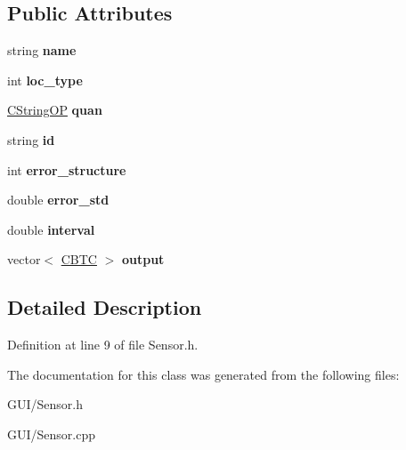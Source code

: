 \subsection*{Public Attributes}
\begin{DoxyCompactItemize}
\item 
\mbox{\label{class_c_sensor_a4289acc92d37101afce47f6d4ead633a}} 
string {\bfseries name}
\item 
\mbox{\label{class_c_sensor_a2e0987a715553b1f45edfa63136a8d91}} 
int {\bfseries loc\+\_\+type}
\item 
\mbox{\label{class_c_sensor_a99c0abe2fd04ec5f48a1b3d432304a10}} 
\hyperlink{class_c_string_o_p}{C\+String\+OP} {\bfseries quan}
\item 
\mbox{\label{class_c_sensor_a125b38fc4560432065fbcc4e34a84eea}} 
string {\bfseries id}
\item 
\mbox{\label{class_c_sensor_a38a11d3bafbfefa72396246f9bac062a}} 
int {\bfseries error\+\_\+structure}
\item 
\mbox{\label{class_c_sensor_af9ac939054634c07660f8a9cbc1cd23a}} 
double {\bfseries error\+\_\+std}
\item 
\mbox{\label{class_c_sensor_a87efad7346099a39d7f6f2f4f224a3a7}} 
double {\bfseries interval}
\item 
\mbox{\label{class_c_sensor_a99ae92275ac6ca39ae238ddfd3090a1f}} 
vector$<$ \hyperlink{class_c_b_t_c}{C\+B\+TC} $>$ {\bfseries output}
\end{DoxyCompactItemize}


\subsection{Detailed Description}


Definition at line 9 of file Sensor.\+h.



The documentation for this class was generated from the following files\+:\begin{DoxyCompactItemize}
\item 
G\+U\+I/Sensor.\+h\item 
G\+U\+I/Sensor.\+cpp\end{DoxyCompactItemize}
